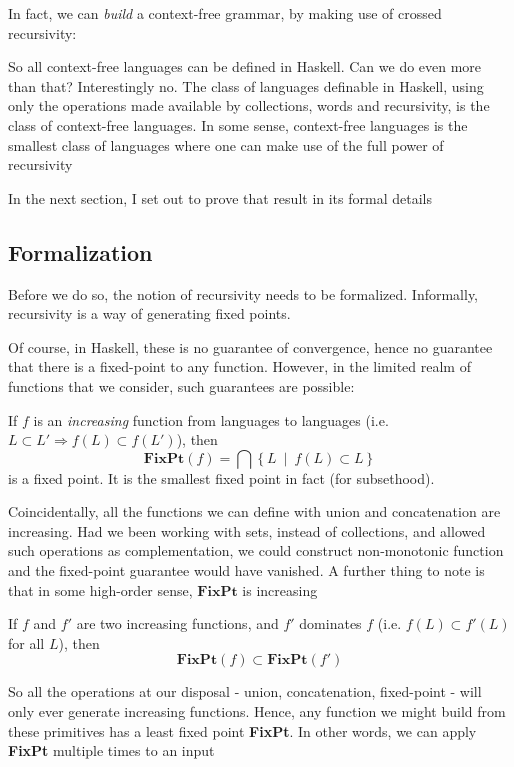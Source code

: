 In fact, we can \emph{build} a context-free grammar, by making use of crossed recursivity:



So all context-free languages can be defined in Haskell. Can we do even more than that? Interestingly no. The class of languages definable in Haskell, using only the operations made available by collections, words and recursivity, is the class of context-free languages. In some sense, context-free languages is the smallest class of languages where one can make use of the full power of recursivity

In the next section, I set out to prove that result in its formal details

\subsection{Formalization}

Before we do so, the notion of recursivity needs to be formalized. Informally, recursivity is a way of generating fixed points.



Of course, in Haskell, these is no guarantee of convergence, hence no guarantee that there is a fixed-point to any function. However, in the limited realm of functions that we consider, such guarantees are possible:

\begin{prop}
If $f$ is an \emph{increasing} function from languages to languages (i.e. $L\subset L' \Rightarrow f(L)\subset f(L')$), then 
$$\mathbf{FixPt}(f) = \bigcap \left\lbrace L\ \middle|\ f(L)\subset L\right\rbrace$$
is a fixed point. It is the smallest fixed point in fact (for subsethood).
\end{prop}
%
Coincidentally, all the functions we can define with union and concatenation are increasing. Had we been working with sets, instead of collections, and allowed such operations as complementation, we could construct non-monotonic function and the fixed-point guarantee would have vanished. A further thing to note is that in some high-order sense, $\mathbf{FixPt}$ is increasing

\begin{prop}
If $f$ and $f'$ are two increasing functions, and $f'$ dominates $f$ (i.e. $f(L)\subset f'(L)$ for all $L$), then 
$$\mathbf{FixPt}(f) \subset \mathbf{FixPt}(f')$$
\end{prop}
%
So all the operations at our disposal - union, concatenation, fixed-point - will only ever generate increasing functions. Hence, any function we might build from these primitives has a least fixed point \textbf{FixPt}. In other words, we can apply \textbf{FixPt} multiple times to an input


